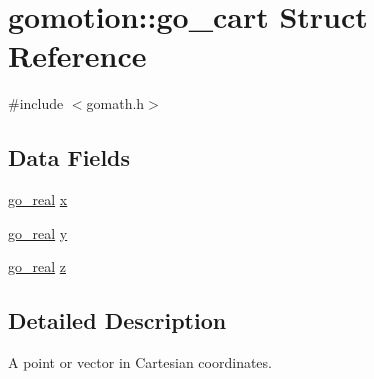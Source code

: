 \hypertarget{structgomotion_1_1go__cart}{\section{gomotion\-:\-:go\-\_\-cart Struct Reference}
\label{structgomotion_1_1go__cart}
}


{\ttfamily \#include $<$gomath.\-h$>$}

\subsection*{Data Fields}
\begin{DoxyCompactItemize}
\item 
\hyperlink{gotypes_8h_afd666a2393eebd71ee455846ac9def9b}{go\-\_\-real} \hyperlink{structgomotion_1_1go__cart_aeeef43b72f7d3ac6f9ca46de289327ad}{x}
\item 
\hyperlink{gotypes_8h_afd666a2393eebd71ee455846ac9def9b}{go\-\_\-real} \hyperlink{structgomotion_1_1go__cart_a7c3bd01f32befc6fa53341024662756a}{y}
\item 
\hyperlink{gotypes_8h_afd666a2393eebd71ee455846ac9def9b}{go\-\_\-real} \hyperlink{structgomotion_1_1go__cart_ab3336b4fb8a6bfa18f55c0558fd5d299}{z}
\end{DoxyCompactItemize}


\subsection{Detailed Description}
A point or vector in Cartesian coordinates. 

